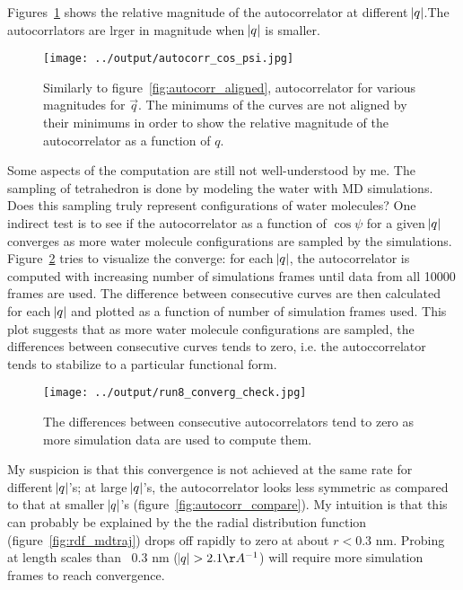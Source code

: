 \documentclass[20pt]{article}
\begin{document}
Figures~\ref{fig:autocorr} shows the relative magnitude of the autocorrelator at different $\abs{q}$.The autocorrlators are lrger in magnitude when $\abs{q}$ is smaller.

\begin{figure}[!h]
  \centering
    \texttt{[image: ../output/autocorr\_cos\_psi.jpg]}
     \caption{Similarly to figure~\ref{fig:autocorr_aligned}, autocorrelator for various magnitudes for $\vec{q}$. The minimums of the curves are not aligned by their minimums in order to show the relative magnitude of the autocorrelator as a function of $q$.} \label{fig:autocorr}
\end{figure}

Some aspects of the computation are still not well-understood by me. The sampling of tetrahedron is done by modeling the water with MD simulations. Does this sampling truly represent configurations of water molecules? One indirect test is to see if the autocorrelator as a function of $\cos{\psi}$ for a given $\abs{q}$ converges as more water molecule configurations are sampled by the simulations. Figure~\ref{fig:autocorr_converge} tries to visualize the converge: for each $\abs{q}$, the autocorrelator is computed with increasing number of simulations frames until data from all 10000 frames are used. The difference between consecutive curves are then calculated for each $\abs{q}$ and plotted as a function of number of simulation frames used. This plot suggests that as more water molecule configurations are sampled, the differences between consecutive curves tends to zero, i.e. the autoccorrelator tends to stabilize to a particular functional form.

\begin{figure}[!h]
  \centering
    \texttt{[image: ../output/run8\_converg\_check.jpg]}
     \caption{The differences between consecutive autocorrelators tend to zero as more simulation data are used to compute them.} \label{fig:autocorr_converge}
\end{figure}

My suspicion is that this convergence is not achieved at the same rate for different $\abs{q}$'s; at large $\abs{q}$'s, the autocorrelator looks less symmetric as compared to that at smaller $\abs{q}$'s (figure~\ref{fig:autocorr_compare}). My intuition is that this can probably be explained by the the radial distribution function (figure~\ref{fig:rdf_mdtraj}) drops off rapidly to zero at about $r<0.3$ nm. Probing at length scales than ~0.3 nm ($\abs{q}>2.1 \AA^{-1}$) will require more simulation frames to reach convergence.
\end{document}

